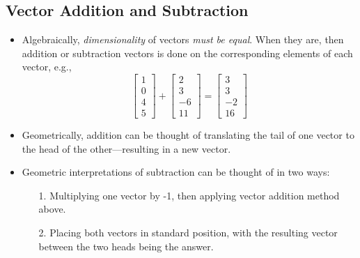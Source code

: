 \begin{itemize}
  \subsection{Vector Addition and Subtraction}\label{Vector Addition and Subtraction}
  \begin{itemize}
    \item Algebraically, \emph{dimensionality} of vectors \emph{must be equal}. When they are, then addition or subtraction vectors is done on the corresponding elements of each vector, e.g.,
    \[%
    \begin{bmatrix}
      1 \\
      0 \\
      4 \\
      5 
    \end{bmatrix}
    +
    \begin{bmatrix}
      2 \\
      3 \\
      -6 \\
      11
    \end{bmatrix}
    =
    \begin{bmatrix}
      3 \\
      3 \\
      -2 \\
      16
    \end{bmatrix}
    \]%
    \item Geometrically, addition can be thought of translating the tail of one vector to the head of the other---resulting in a new vector. 
    \item Geometric interpretations of subtraction can be thought of in two ways:
    \begin{itemize}
      \item[1.] Multiplying one vector by -1, then applying vector addition method above.
      \item[2.] Placing both vectors in standard position, with the resulting vector between the two heads being the answer.
    \end{itemize}
  \end{itemize}
  

\end{itemize}
